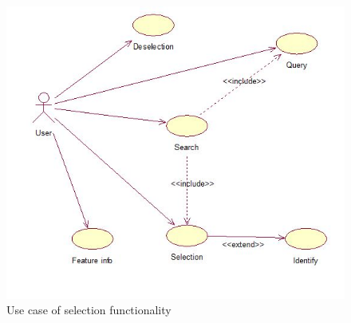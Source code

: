 \begin{figure}[h]
\begin{center}
  \includegraphics [scale=0.7] {Selection.jpg}
  \caption[Use Case - Selection]{Use case of selection functionality}
\end{center}
\end{figure}
